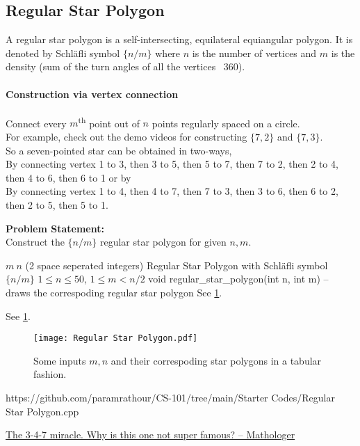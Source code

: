 \subsection{Regular Star Polygon}{\label{pp:regularstarpolygon}}
A regular star polygon is a self-intersecting, equilateral equiangular polygon. It is denoted by Schl\"afli symbol $\{n/m\}$ where $n$ is the number of vertices and $m$ is the density (sum of the turn angles of all the vertices \ 360\textdegree).
\vspace{-1em}\paragraph{Construction via vertex connection} Connect every $m$\textsuperscript{th} point out of $n$ points regularly spaced on a circle.\\
For example, check out the demo videos for constructing \href{https://github.com/paramrathour/CS-101/tree/main/Media/Regular Star Polygon/7-2.mkv}{$\{7,2\}$} and \href{https://github.com/paramrathour/CS-101/tree/main/Media/Regular Star Polygon/7-3.mkv}{$\{7,3\}$}.\\
So a seven-pointed star can be obtained in two-ways,\\
By connecting vertex 1 to 3, then 3 to 5, then 5 to 7, then 7 to 2, then 2 to 4, then 4 to 6, then 6 to 1 or by\\
By connecting vertex 1 to 4, then 4 to 7, then 7 to 3, then 3 to 6, then 6 to 2, then 2 to 5, then 5 to 1.

\textbf{Problem Statement:}\\
Construct the $\{n/m\}$ regular star polygon for given $n,m$.
\begin{testcasesFunction}
	{$m\ n$ \hfill(2 space seperated integers)}
	{Regular Star Polygon with Schl\"afli symbol $\{n/m\}$}
	{$1 \leq n \leq 50$, $1 \leq m < n/2$}
	{void regular\_star\_polygon(int n, int m) -- draws the correspoding regular star polygon}
	{See \ref{fig:regularstarpolygon}.}
	{See \ref{fig:regularstarpolygon}.
	\begin{figure}[H]
	\texttt{[image: Regular Star Polygon.pdf]}
	\caption{Some inputs $m,n$ and their correspoding star polygons in a tabular fashion.}
	\label{fig:regularstarpolygon}
	\end{figure}
	}
	{https://github.com/paramrathour/CS-101/tree/main/Starter Codes/Regular Star Polygon.cpp}
\end{testcasesFunction}
\begin{funvideo}
\href{https://youtu.be/oEN0o9ZGmOM}{The 3-4-7 miracle. Why is this one not super famous? -- Mathologer}
\end{funvideo}